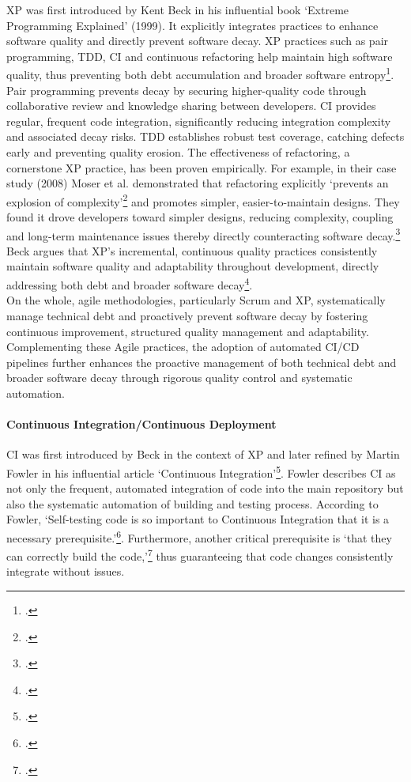 \ac{XP} was first introduced by Kent Beck in his influential book `Extreme Programming Explained' (1999).
It explicitly integrates practices to enhance software quality and directly prevent software decay.
\ac{XP} practices such as pair programming, \ac{TDD}, \ac{CI} and continuous refactoring help maintain high software quality, thus preventing both debt accumulation
and broader software entropy\footcite[5-6]{beckExtremeProgrammingExplained1999}.
Pair programming prevents decay by securing higher-quality code through collaborative review and knowledge sharing between developers.
\ac{CI} provides regular, frequent code integration, significantly reducing integration complexity and associated decay risks.
\ac{TDD} establishes robust test coverage, catching defects early and preventing quality erosion.
The effectiveness of refactoring, a cornerstone XP practice, has been proven empirically. For example, in their case study (2008) Moser et al.
demonstrated that refactoring explicitly `prevents an explosion of complexity'\footcite[262]{moserCaseStudyImpact2008}
and promotes simpler, easier-to-maintain designs.
They found it drove developers toward simpler designs, reducing complexity, coupling and long-term maintenance issues thereby directly counteracting software decay.\footcite[262]{moserCaseStudyImpact2008}
Beck argues that \ac{XP}'s incremental, continuous quality practices consistently maintain software quality and adaptability throughout development, directly addressing both debt and broader software decay\footcite[5-7]{beckExtremeProgrammingExplained1999}.\\
On the whole, agile methodologies, particularly Scrum and \ac{XP}, systematically manage technical debt and proactively prevent software decay by fostering continuous improvement, structured quality management and adaptability.
Complementing these Agile practices, the adoption of automated \ac{CI/CD} pipelines further enhances the proactive management of both technical debt
and broader software decay through rigorous quality control and systematic automation.\\

\paragraph{Continuous Integration/Continuous Deployment}
\ac{CI} was first introduced by Beck in the context of \ac{XP} and later refined by Martin Fowler in his influential article `Continuous Integration'\footcite{fowlerContinuousIntegration2006}.
Fowler describes \ac{CI} as not only the frequent, automated integration of code into the main repository but also the systematic automation of building and testing process.
According to Fowler, `Self-testing code is so important to Continuous Integration that it is a necessary prerequisite.'\footcite{fowlerContinuousIntegration2006}.
Furthermore, another critical prerequisite is `that they can correctly build the code,'\footcite{fowlerContinuousIntegration2006} thus guaranteeing that code changes consistently
integrate without issues.\\

